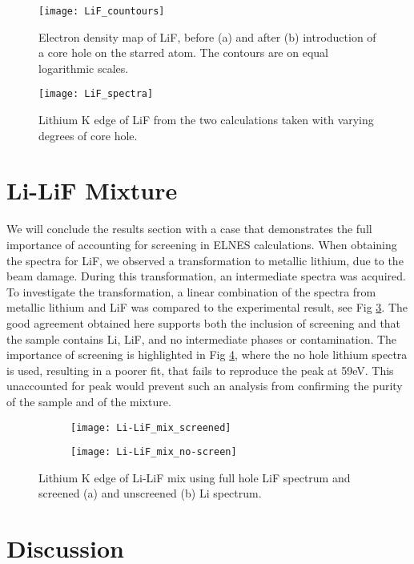\begin{figure}
	\centering
	\texttt{[image: LiF\_countours]}
	\caption{Electron density map of LiF, before (a) and after (b) introduction of a core hole on the starred atom.  The contours are on equal logarithmic scales.}
	\label{LiF_countours}
\end{figure}

\begin{figure}
	\centering
	\texttt{[image: LiF\_spectra]}
	\caption{Lithium K edge of LiF from the two calculations taken with varying degrees of core hole. }
	\label{LiF_spectra}
\end{figure}



\section{Li-LiF Mixture}
We will conclude the results section with a case that demonstrates the full importance of accounting for screening in ELNES calculations.  When obtaining the spectra for LiF, we observed a transformation to metallic lithium, due to the beam damage.   During this transformation, an intermediate spectra was acquired.  To investigate the transformation, a linear combination of the spectra from metallic lithium and LiF was compared to the experimental result, see Fig \ref{mix-screened}.  The good agreement obtained here supports both the inclusion of screening and that the sample contains  Li, LiF, and no intermediate phases or contamination.  The importance of screening is highlighted in Fig \ref{mix-unscreened}, where the no hole lithium spectra is used, resulting in a poorer fit, that fails to reproduce the peak at 59eV.  This unaccounted for peak would prevent such an  analysis from confirming the purity of the sample and of the mixture.  



\begin{figure}
	\centering
	\begin{subfigure}{0.45\textwidth}
		\texttt{[image: Li-LiF\_mix\_screened]}
		\caption{}
		\label{mix-screened}
	\end{subfigure}
\hfill
	\begin{subfigure}{0.45\textwidth}
		\texttt{[image: Li-LiF\_mix\_no-screen]}
		\caption{}
		\label{mix-unscreened}
	\end{subfigure}
	\caption{Lithium K edge of Li-LiF mix using full hole LiF spectrum and screened (a) and unscreened (b) Li spectrum. }

\label{Li-LiF_mix_screened}
\end{figure}



\section{Discussion}









\newpage




